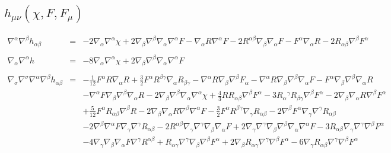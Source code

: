 \documentclass[10pt,letterpaper]{article}
\numberwithin{equation}{section}
\begin{document}
\subsection{$h_{\mu\nu}(\chi,F,F_\mu)$}
\begin{eqnarray}
\nabla^\alpha\nabla^\beta h_{\alpha\beta} &=& - 2 \nabla_{\alpha }\nabla^{\alpha }\chi + 2 \nabla_{\beta }\nabla^{\beta }\nabla_{\alpha }\nabla^{\alpha }F -  \nabla_{\alpha }R \nabla^{\alpha }F - 2 R^{\alpha \beta } \nabla_{\beta }\nabla_{\alpha }F - F^{\alpha } \nabla_{\alpha }R - 2 R_{\alpha \beta } \nabla^{\beta }F^{\alpha }
\\ \nonumber\\
\nabla_\alpha\nabla^\alpha h &=& -8 \nabla_{\alpha }\nabla^{\alpha }\chi + 2 \nabla_{\beta }\nabla^{\beta }\nabla_{\alpha }\nabla^{\alpha }F
\\ \nonumber\\
\nabla_\sigma\nabla^\sigma\nabla^\alpha\nabla^\beta h_{\alpha\beta} &=&
 - \tfrac{1}{12} F^{\alpha } R \nabla_{\alpha }R + \tfrac{3}{2} F^{\alpha } R^{\beta \gamma } \nabla_{\alpha }R_{\beta \gamma } -  \nabla^{\alpha }R \nabla_{\beta }\nabla^{\beta }F_{\alpha } -  \nabla^{\alpha }R \nabla_{\beta }\nabla^{\beta }\nabla_{\alpha }F -  F^{\alpha } \nabla_{\beta }\nabla^{\beta }\nabla_{\alpha }R \nonumber \\ 
&& -  \nabla^{\alpha }F \nabla_{\beta }\nabla^{\beta }\nabla_{\alpha }R - 2 \nabla_{\beta }\nabla^{\beta }\nabla_{\alpha }\nabla^{\alpha }\chi + \tfrac{4}{3} R R_{\alpha \beta } \nabla^{\beta }F^{\alpha } - 3 R_{\alpha }{}^{\gamma } R_{\beta \gamma } \nabla^{\beta }F^{\alpha } - 2 \nabla_{\beta }\nabla_{\alpha }R \nabla^{\beta }F^{\alpha } \nonumber \\ 
&& + \tfrac{5}{12} F^{\alpha } R_{\alpha \beta } \nabla^{\beta }R - 2 \nabla_{\beta }\nabla_{\alpha }R \nabla^{\beta }\nabla^{\alpha }F -  \tfrac{3}{2} F^{\alpha } R^{\beta \gamma } \nabla_{\gamma }R_{\alpha \beta } - 2 \nabla^{\beta }F^{\alpha } \nabla_{\gamma }\nabla^{\gamma }R_{\alpha \beta } \nonumber \\ 
&& - 2 \nabla^{\beta }\nabla^{\alpha }F \nabla_{\gamma }\nabla^{\gamma }R_{\alpha \beta } - 2 R^{\alpha \beta } \nabla_{\gamma }\nabla^{\gamma }\nabla_{\beta }\nabla_{\alpha }F + 2 \nabla_{\gamma }\nabla^{\gamma }\nabla_{\beta }\nabla^{\beta }\nabla_{\alpha }\nabla^{\alpha }F - 3 R_{\alpha \beta } \nabla_{\gamma }\nabla^{\gamma }\nabla^{\beta }F^{\alpha } \nonumber \\ 
&& - 4 \nabla_{\gamma }\nabla_{\beta }\nabla_{\alpha }F \nabla^{\gamma }R^{\alpha \beta } + R_{\alpha \gamma } \nabla^{\gamma }\nabla_{\beta }\nabla^{\beta }F^{\alpha } + 2 \nabla_{\beta }R_{\alpha \gamma } \nabla^{\gamma }\nabla^{\beta }F^{\alpha } - 6 \nabla_{\gamma }R_{\alpha \beta } \nabla^{\gamma }\nabla^{\beta }F^{\alpha }
\end{eqnarray}
%
%
%
\end{document}
